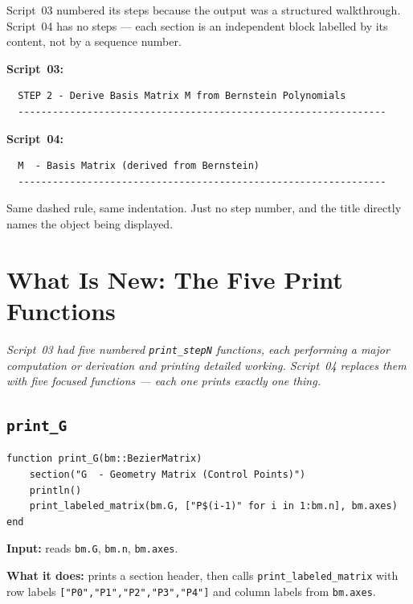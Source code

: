 \documentclass[12pt, a4paper]{article}
\newcommand{\cd}[1]{\texttt{#1}}
\begin{document}
Script~03 numbered its steps because the output was a
structured walkthrough.
Script~04 has no steps --- each section is an independent
block labelled by its content, not by a sequence number.

\begin{examplebox}
\textbf{Script~03:}
\begin{verbatim}
  STEP 2 - Derive Basis Matrix M from Bernstein Polynomials
  ----------------------------------------------------------------
\end{verbatim}

\textbf{Script~04:}
\begin{verbatim}
  M  - Basis Matrix (derived from Bernstein)
  ----------------------------------------------------------------
\end{verbatim}

Same dashed rule, same indentation.
Just no step number, and the title directly names the object
being displayed.
\end{examplebox}


\section{What Is New: The Five Print Functions}

\textit{Script~03 had five numbered \cd{print\_stepN} functions,
each performing a major computation or derivation and
printing detailed working.
Script~04 replaces them with five focused functions ---
each one prints exactly one thing.}

\subsection{\texttt{print\_G}}

\begin{verbatim}
function print_G(bm::BezierMatrix)
    section("G  - Geometry Matrix (Control Points)")
    println()
    print_labeled_matrix(bm.G, ["P$(i-1)" for i in 1:bm.n], bm.axes)
end
\end{verbatim}

\textbf{Input:} reads \cd{bm.G}, \cd{bm.n}, \cd{bm.axes}.

\textbf{What it does:} prints a section header, then calls
\cd{print\_labeled\_matrix} with row labels
\cd{["P0","P1","P2","P3","P4"]} and column labels from
\cd{bm.axes}.
\end{document}
